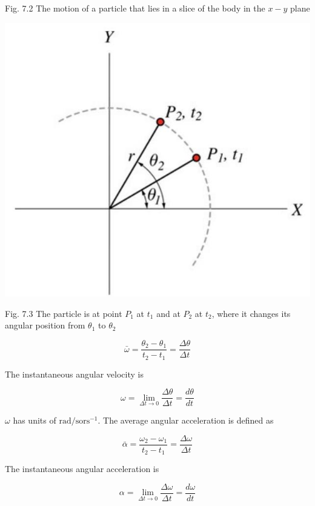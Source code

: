 \documentclass[10pt]{article}
\begin{document}
Fig. 7.2 The motion of a particle that lies in a slice of the body in the $x-y$ plane

\begin{center}
\includegraphics[max width=\textwidth]{2024_09_13_db1f357d2aad0a03eb2eg-112(2)}
\end{center}

Fig. 7.3 The particle is at point $P_{1}$ at $t_{1}$ and at $P_{2}$ at $t_{2}$, where it changes its angular position from $\theta_{1}$ to $\theta_{2}$

$$
\bar{\omega}=\frac{\theta_{2}-\theta_{1}}{t_{2}-t_{1}}=\frac{\Delta \theta}{\Delta t}
$$

The instantaneous angular velocity is

$$
\omega=\lim _{\Delta t \rightarrow 0} \frac{\Delta \theta}{\Delta t}=\frac{d \theta}{d t}
$$

$\omega$ has units of $\mathrm{rad} / \mathrm{s} \mathrm{or} \mathrm{s}^{-1}$. The average angular acceleration is defined as

$$
\bar{\alpha}=\frac{\omega_{2}-\omega_{1}}{t_{2}-t_{1}}=\frac{\Delta \omega}{\Delta t}
$$

The instantaneous angular acceleration is

$$
\alpha=\lim _{\Delta t \rightarrow 0} \frac{\Delta \omega}{\Delta t}=\frac{d \omega}{d t}
$$
\end{document}
